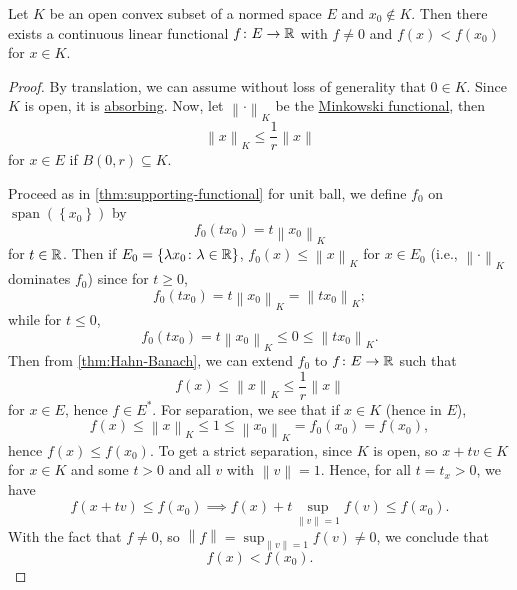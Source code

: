 \begin{theorem}\label{thm:separation-of-a-point-from-a-convex-set}
	Let \(K\) be an open convex subset of a normed space \(E\) and \(x_0 \notin K\). Then there exists a continuous linear functional \(f\colon E\to \mathbb{\MakeUppercase{r}} \) with \(f\neq 0\) and \(f(x) < f(x_0)\) for \(x\in K\).
\end{theorem}
\begin{proof}
	By translation, we can assume without loss of generality that \(0\in K\). Since \(K\) is open, it is \hyperref[def:absorbing]{absorbing}. Now, let \(\left\lVert \cdot\right\rVert _K\) be the \hyperref[def:Minkowski-functional]{Minkowski functional}, then
	\[
		\left\lVert x\right\rVert _K \leq \frac{1}{r}\left\lVert x\right\rVert
	\]
	for \(x\in E\) if \(B(0, r)\subseteq K\).
	\begin{center}
	\end{center}
	Proceed as in \autoref{thm:supporting-functional} for unit ball, we define \(f_0\) on \(\mathop{\mathrm{span}}(\left\{ x_0 \right\} )\) by
	\[
		f_0(tx_0) = t\left\lVert x_0\right\rVert_K
	\]
	for \(t\in \mathbb{\MakeUppercase{r}} \). Then if \(E_0 = \left\{ \lambda x_0 \colon \lambda \in \mathbb{\MakeUppercase{r}}  \right\} \), \(f_0 (x) \leq \left\lVert x\right\rVert _K\) for \(x\in E_0\) (i.e., \(\left\lVert \cdot\right\rVert _K\) dominates \(f_0\)) since for \(t \geq 0\),
	\[
		f_0 (tx_0) = t \left\lVert x_0\right\rVert _K= \left\lVert t x_0\right\rVert_K;
	\]
	while for \(t \leq 0\),
	\[
		f_0 ( tx_0) = t\left\lVert x_0\right\rVert_K \leq 0\leq \left\lVert t x_0\right\rVert _K.
	\]
	Then from \autoref{thm:Hahn-Banach}, we can extend \(f_0\) to \(f\colon E\to \mathbb{\MakeUppercase{r}} \) such that
	\[
		f(x) \leq \left\lVert x\right\rVert _K \leq \frac{1}{r} \left\lVert x\right\rVert
	\]
	for \(x\in E\), hence \(f\in E^{\ast} \). For separation, we see that if \(x\in K\) (hence in \(E\)),
	\[
		f(x) \leq \left\lVert x\right\rVert _K \leq 1 \leq \left\lVert x_0\right\rVert _K = f_0 (x_0) = f(x_0),
	\]
	hence \(f(x) \leq f(x_0)\). To get a strict separation, since \(K\) is open, so \(x + tv\in K\) for \(x\in K\) and some \(t > 0\) and all \(v\) with \(\left\lVert v\right\rVert = 1\). Hence, for all \(t = t_x > 0\), we have
	\[
		f(x + tv) \leq f(x_0) \implies f(x) + t \sup _{\left\lVert v\right\rVert = 1}f(v) \leq f(x_0).
	\]
	With the fact that \(f\neq 0\), so \(\left\lVert f\right\rVert = \sup _{\left\lVert v\right\rVert = 1}f(v) \neq 0\), we conclude that
	\[
		f(x) < f(x_0).
	\]
\end{proof}

